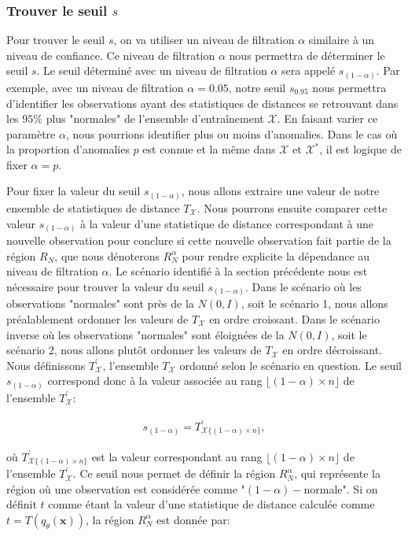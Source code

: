 \subsubsection{Trouver le seuil $s$}

 Pour trouver le seuil $s$, on va utiliser un niveau de filtration $\alpha$ similaire à un niveau de confiance. Ce niveau de filtration $\alpha$ nous permettra de déterminer le seuil $s$. Le seuil déterminé avec un niveau de filtration $\alpha$ sera appelé $s_{(1-\alpha)}$. Par exemple, avec un niveau de filtration $\alpha=0.05$, notre seuil $s_{0.95}$ nous permettra d'identifier les observations ayant des statistiques de distances se retrouvant dans les $95\%$ plus "normales" de l'ensemble d'entraînement $\mathcal{X}$. En faisant varier ce paramètre $\alpha$, nous pourrions identifier plus ou moins d'anomalies. Dans le cas où la proportion d'anomalies $p$ est connue et la même dans  $\mathcal{X}$ et $\mathcal{X}^*$, il est logique de fixer $\alpha=p$.

Pour fixer la valeur du  seuil $s_{(1-\alpha)}$, nous allons extraire une valeur de notre ensemble de statistiques de distance $T_{\mathcal{X}}$. Nous pourrons ensuite comparer cette valeur $s_{(1-\alpha)}$ à la valeur d'une statistique de distance  correspondant à une nouvelle observation pour conclure si cette nouvelle observation fait partie de la région $R_N$, que nous dénoterons $R_{N}^{\alpha}$ pour rendre explicite la dépendance au niveau de filtration $\alpha$. Le scénario identifié à la section précédente nous est nécessaire pour trouver la valeur du seuil $s_{(1-\alpha)}$. Dans le scénario où les observations "normales" sont près de la $N(0,I)$, soit le scénario 1, nous allons préalablement ordonner les valeurs de $T_{\mathcal{X}}$ en ordre croissant. Dans le scénario inverse où les observations "normales" sont éloignées de la $N(0,I)$, soit le scénario 2, nous allons plutôt ordonner les valeurs de $T_{\mathcal{X}}$ en ordre décroissant. Nous définissons $T^{'}_{\mathcal{X}}$, l'ensemble $T_{\mathcal{X}}$ ordonné selon le scénario en question. Le seuil $s_{(1-\alpha)}$ correspond donc à la valeur associée au rang $\lfloor(1 - \alpha) \times n\rfloor$ de l'ensemble $T^{'}_{\mathcal{X}}$:

\begin{gather*} \label{eq:seuil}
s_{(1 - \alpha)} = T^{'}_{\mathcal{X} \{(1 - \alpha) \times n\}},
\end{gather*}

où $T^{'}_{\mathcal{X} \{(1 - \alpha) \times n\}}$ est la valeur correspondant au rang $\lfloor(1 - \alpha) \times n\rfloor$ de l'ensemble $T^{'}_{\mathcal{X}}$. Ce seuil nous permet de définir la région $R_{N}^{\alpha}$, qui représente la région où une observation est considérée comme "$(1-\alpha)-$normale". Si on définit $t$ comme étant la valeur d'une statistique de distance calculée comme $t = T(q_\theta(\boldsymbol{x}))$, la région $R_{N}^{\alpha}$ est donnée par:

